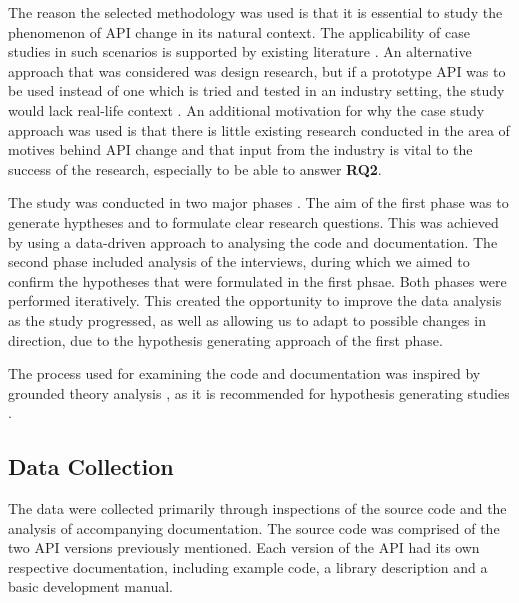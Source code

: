 \documentclass{sig-alternate}
\begin{document}
The reason the selected methodology was used is that it is essential to study the phenomenon of API change in its natural context. The applicability of case studies in such scenarios is supported by existing literature \cite{benbasat1987case} \cite{runeson2009guidelines} \cite{yin2013case} \cite{robson2002real}. An alternative approach that was considered was design research, but if a prototype API was to be used instead of one which is tried and tested in an industry setting, the study would lack real-life context \cite{runeson2009guidelines}. An additional motivation for why the case study approach was used is that there is little existing research conducted in the area of motives behind API change and that input from the industry is vital to the success of the research, especially to be able to answer \textbf{RQ2}. 

The study was conducted in two major phases \cite{andersson2007spiral}. The aim of the first phase was to generate hyptheses and to formulate clear research questions. This was achieved by using a data-driven approach to analysing the code and documentation. The second phase included analysis of the interviews, during which we aimed to confirm the hypotheses that were formulated in the first phsae. Both phases were performed iteratively. This created the opportunity to improve the data analysis as the study progressed, as well as allowing us to adapt to possible changes in direction, due to the hypothesis generating approach of the first phase. 

The process used for examining the code and documentation was inspired by grounded theory analysis \cite{seaman1999qualitative}, as it is recommended for hypothesis generating studies \cite{runeson2009guidelines} \cite{seaman1999qualitative}. 






\subsection{Data Collection} \label{data_collection}  
The data were collected primarily through inspections of the source code and the analysis of accompanying documentation. The source code was comprised of the two API versions previously mentioned. Each version of the API had its own respective documentation, including example code, a library description and a basic development manual. 
\end{document}
